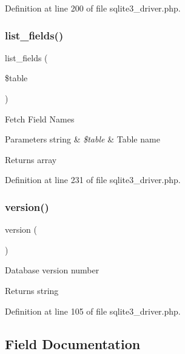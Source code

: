 Definition at line 200 of file sqlite3\+\_\+driver.\+php.

\mbox{\label{class_c_i___d_b__sqlite3__driver_aef08cd376b16b24608100ca0e3f2f85b}} 
\subsubsection{\texorpdfstring{list\_fields()}{list\_fields()}}
{\footnotesize\ttfamily list\+\_\+fields (\begin{DoxyParamCaption}\item[{}]{\$table }\end{DoxyParamCaption})}

Fetch Field Names


\begin{DoxyParams}[1]{Parameters}
string & {\em \$table} & Table name \\
\hline
\end{DoxyParams}
\begin{DoxyReturn}{Returns}
array 
\end{DoxyReturn}


Definition at line 231 of file sqlite3\+\_\+driver.\+php.

\mbox{\label{class_c_i___d_b__sqlite3__driver_a6080dae0886626b9a4cedb29240708b1}} 
\subsubsection{\texorpdfstring{version()}{version()}}
{\footnotesize\ttfamily version (\begin{DoxyParamCaption}{ }\end{DoxyParamCaption})}

Database version number

\begin{DoxyReturn}{Returns}
string 
\end{DoxyReturn}


Definition at line 105 of file sqlite3\+\_\+driver.\+php.



\subsection{Field Documentation}
\mbox{\label{class_c_i___d_b__sqlite3__driver_a10213aa6e05f6d924d3277bb1d2fea00}} 
